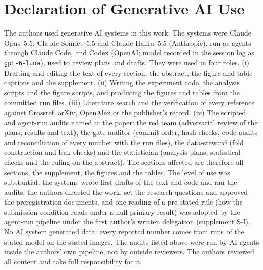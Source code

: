 \section*{Declaration of Generative AI Use}
The authors used generative AI systems in this work.
The systems were Claude Opus~5.5, Claude Sonnet~5.5 and Claude Haiku~5.5 (Anthropic), run as agents through Claude Code, and Codex
(OpenAI; model recorded in the session log as \texttt{gpt-6-luna}), used to review plans and drafts.
They were used in four roles.
(i) Drafting and editing the text of every section, the abstract, the figure and table captions and the supplement.
(ii) Writing the experiment code, the analysis scripts and the figure scripts, and producing the figures and tables from the committed
run files.
(iii) Literature search and the verification of every reference against Crossref, arXiv, OpenAlex or the publisher's record.
(iv) The scripted and agent-run audits named in the paper: the red team (adversarial review of the plans, results and text), the
gate-auditor (commit order, hash checks, code audits and reconciliation of every number with the run files), the data-steward (fold
construction and leak checks) and the statistician (analysis plans, statistical checks and the ruling on the abstract).
The sections affected are therefore all sections, the supplement, the figures and the tables.
The level of use was substantial: the systems wrote first drafts of the text and code and ran the audits; the authors directed the
work, set the research questions and approved the preregistration documents, and one reading of a pre-stated rule (how the
submission condition reads under a null primary result) was adopted by the agent-run pipeline under the first author's written
delegation (supplement S-I).
No AI system generated data: every reported number comes from runs of the stated model on the stated images.
The audits listed above were run by AI agents inside the authors' own pipeline, not by outside reviewers.
The authors reviewed all content and take full responsibility for it.
